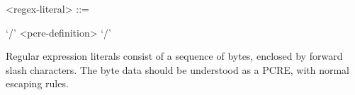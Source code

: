 \begin{grammar}
  <regex-literal> ::= \begin{syntdiag}
    `/'
    <pcre-definition>
    `/'
  \end{syntdiag}
\end{grammar}

Regular expression literals consist of a sequence of bytes, enclosed by
forward slash characters. The byte data should be understood as a PCRE,
with normal escaping rules.

% 
% 
% 
